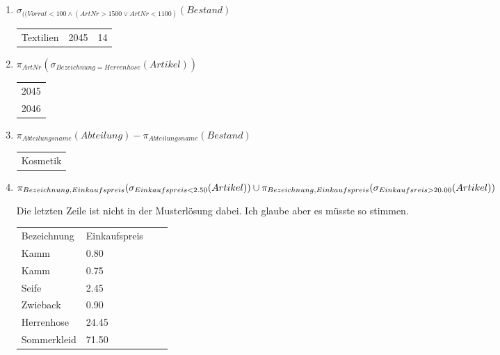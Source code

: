 \documentclass{lehramt-informatik-aufgabe}
\begin{document}
\begin{enumerate}
\begin{enumerate}

\item $\sigma_{((Vorrat < 100 \land (ArtNr > 1500  \lor ArtNr < 1100)}(Bestand)$

\begin{antwort}[muster]
\begin{tabular}{lll}
Textilien       & 2045  & 14
\end{tabular}
\end{antwort}


\item $\pi_{ArtNr}(\sigma_{Bezeichnung=Herrenhose}(Artikel))$

\begin{antwort}[muster]
\begin{tabular}{l}
2045 \\
2046
\end{tabular}
\end{antwort}


\item $\pi_{Abteilungsname}(Abteilung) - \pi_{Abteilungsname} (Bestand)$

\begin{antwort}[muster]
\begin{tabular}{l}
Kosmetik
\end{tabular}
\end{antwort}


\item

\begin{math}
\pi_{Bezeichnung,Einkaufspreis}(\sigma_{Einkaufspreis < 2.50} (Artikel))
\cup\\
\pi_{Bezeichnung,Einkaufspreis}(\sigma_{Einkaufsreis > 20.00} (Artikel))
\end{math}

\begin{antwort}[muster]
Die letzten Zeile ist nicht in der Musterlösung dabei. Ich glaube aber
es müsste so stimmen.

\begin{tabular}{llll}
Bezeichnung  & Einkaufspreis \\
Kamm         & 0.80          \\
Kamm         & 0.75          \\
Seife        & 2.45          \\
Zwieback     & 0.90          \\
Herrenhose   & 24.45         \\
Sommerkleid  & 71.50
\end{tabular}
\end{antwort}
\end{enumerate}
\end{enumerate}
\end{document}
